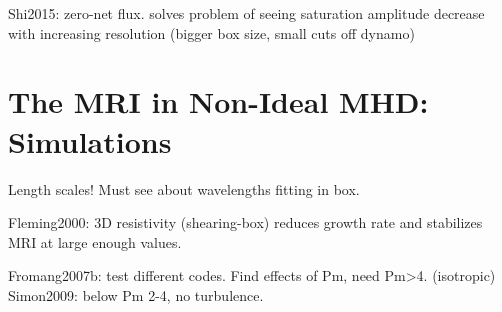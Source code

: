 Shi2015: zero-net flux. solves problem of seeing saturation amplitude decrease with increasing resolution (bigger box size, small cuts off dynamo)

\section{The MRI in Non-Ideal MHD: Simulations}
Length scales!
Must see about wavelengths fitting in box.



Fleming2000: 3D resistivity (shearing-box) reduces growth rate and stabilizes MRI at large enough values. 

Fromang2007b: test different codes. Find effects of Pm, need Pm>4. (isotropic)
Simon2009: below Pm 2-4, no turbulence.
